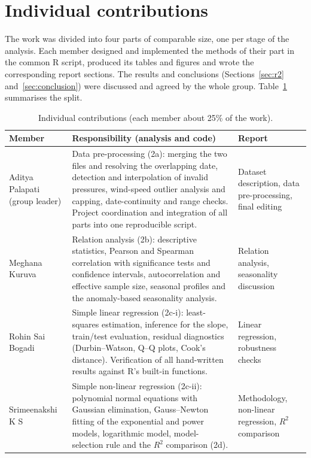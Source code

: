 \documentclass[11pt,a4paper]{article}
\newcommand{\Rsq}{R^2}
\begin{document}
\section{Individual contributions}

The work was divided into four parts of comparable size, one per stage of the
analysis. Each member designed and implemented the methods of their part in the
common R script, produced its tables and figures and wrote the corresponding report
sections. The results and conclusions (Sections~\ref{sec:r2} and~\ref{sec:conclusion})
were discussed and agreed by the whole group. Table~\ref{tab:contrib} summarises the
split.

\begin{table}[H]
  \centering
  \caption{Individual contributions (each member about 25\% of the work).}
  \label{tab:contrib}
  \begin{tabular}{p{3.3cm}p{6.6cm}p{4.2cm}}
    \toprule
    Member & Responsibility (analysis and code) & Report \\
    \midrule
    Aditya Palapati \newline (group leader) &
     {\raggedright Data pre-processing (2a): merging the two files and resolving the overlapping
      date, detection and interpolation of invalid pressures, wind-speed outlier
      analysis and capping, date-continuity and range checks. Project coordination
      and integration of all parts into one reproducible script.\par} &
     {\raggedright Dataset description, data pre-processing, final editing\par} \\
    \addlinespace
    Meghana Kuruva &
     {\raggedright Relation analysis (2b): descriptive statistics, Pearson and Spearman
      correlation with significance tests and confidence intervals, autocorrelation
      and effective sample size, seasonal profiles and the anomaly-based
      seasonality analysis.\par} &
     {\raggedright Relation analysis, seasonality discussion\par} \\
    \addlinespace
    Rohin Sai Bogadi &
     {\raggedright Simple linear regression (2c-i): least-squares estimation, inference for the
      slope, train/test evaluation, residual diagnostics (Durbin--Watson, Q--Q
      plots, Cook's distance). Verification of all hand-written results against
      R's built-in functions.\par} &
     {\raggedright Linear regression, robustness checks\par} \\
    \addlinespace
    Srimeenakshi K S &
     {\raggedright Simple non-linear regression (2c-ii): polynomial normal equations with
      Gaussian elimination, Gauss--Newton fitting of the exponential and power
      models, logarithmic model, model-selection rule and the $\Rsq$ comparison (2d).\par} &
     {\raggedright Methodology, non-linear regression, $\Rsq$ comparison\par} \\
    \bottomrule
  \end{tabular}
\end{table}
\end{document}
